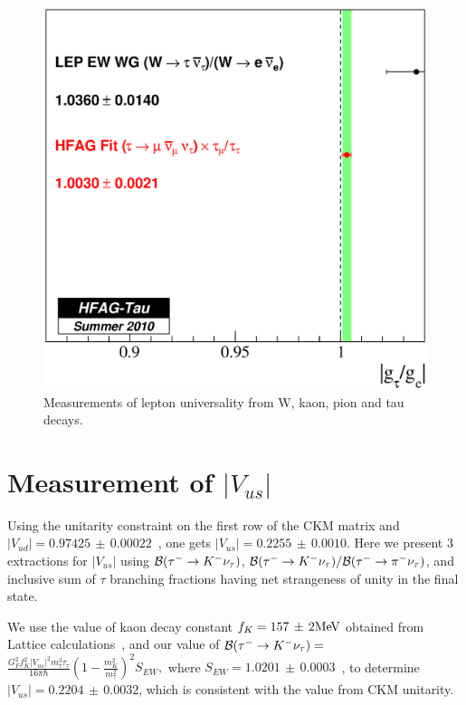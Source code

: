 \documentclass[fleqn,twoside]{article}
\newcommand{\mev}{\ensuremath{\mathrm{Me\kern -0.1em V}}\xspace}
\def\Vus  {\ensuremath{|V_{us}|}\xspace}
\def\Vud  {\ensuremath{|V_{ud}|}\xspace}
\begin{document}
\begin{figure}[!hbtp]
\begin{center}
\begin{minipage}{.42\textwidth}
\includegraphics[height=.3\textheight]{figures/gtauge.eps}
\end{minipage}
\end{center}
\caption{Measurements of lepton universality from W, kaon, pion and tau decays.}
\label{fig:TauLU}
\end{figure}

\section{Measurement of $|V_{us}|$}
\label{sec:Tau_Vus}

\newcommand{\Vudvalue} {\ensuremath{0.97425\, \pm\, 0.00022}\xspace}

Using the unitarity constraint on the first row of the CKM matrix
and $\Vud = \Vudvalue$~\cite{Hardy:2008gy}, one gets $\Vus = 0.2255\, \pm\, 0.0010$.
Here we present 3 extractions for $|V_{us}|$ using
${\cal{B}}({\tau^-\to K^-\nu_\tau})$, 
${{\cal{B}}({\tau^- \to K^-\nu_\tau})}/
{{\cal{B}}({\tau^- \to \pi^-\nu_\tau})}$,
and inclusive sum of $\tau$ branching fractions having net strangeness of unity in the final state.

We use the value of kaon decay constant $f_K = 157\, \pm\, 2 \mev$ 
obtained from Lattice calculations~\cite{Follana:2007uv}, 
and our value of ${\cal{B}}({\tau^-\to K^-\nu_\tau}) =$
$\frac{G^2_F f^2_K \Vus^2 m^3_{\tau} \tau_{\tau}}{16\pi\hbar} \left (1 - \frac{m_K^2}{m_\tau^2} \right )^2 S_{EW},$
where $S_{EW} = 1.0201\, \pm\, 0.0003$~\cite{Erler:2002mv},
to determine $\Vus= 0.2204\, \pm\, 0.0032$,
which is consistent with the value from CKM unitarity.
\end{document}
